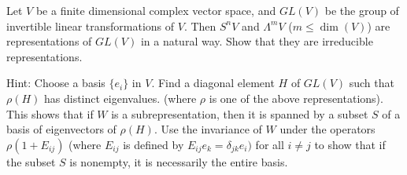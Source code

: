 \documentclass[twoside]{article}
\begin{document}
\newpage
\begin{ejercicio}{3.19}
Let $V$ be a finite dimensional complex vector space, and $GL(V)$ be the group of invertible linear transformations of $V$. Then $S^nV$ and $\Lambda^m V$ ($m ≤ \dim(V )$) are representations of $GL(V )$ in a natural way. Show that they are irreducible representations.

Hint: Choose a basis $\{e_i\}$ in $V$. Find a diagonal element $H$ of $GL(V)$ such that $ρ(H)$ has
distinct eigenvalues. (where $ρ$ is one of the above representations). This shows that if $W$ is a
subrepresentation, then it is spanned by a subset $S$ of a basis of eigenvectors of $ρ(H)$. Use the
invariance of $W$ under the operators $ρ(1+E_{ij})$ (where $E_{ij}$ is defined by $E_{ij}e_k = δ_{jk}e_i)$ for all $i \neq j$
to show that if the subset $S$ is nonempty, it is necessarily the entire basis.
\end{ejercicio}
\end{document}
